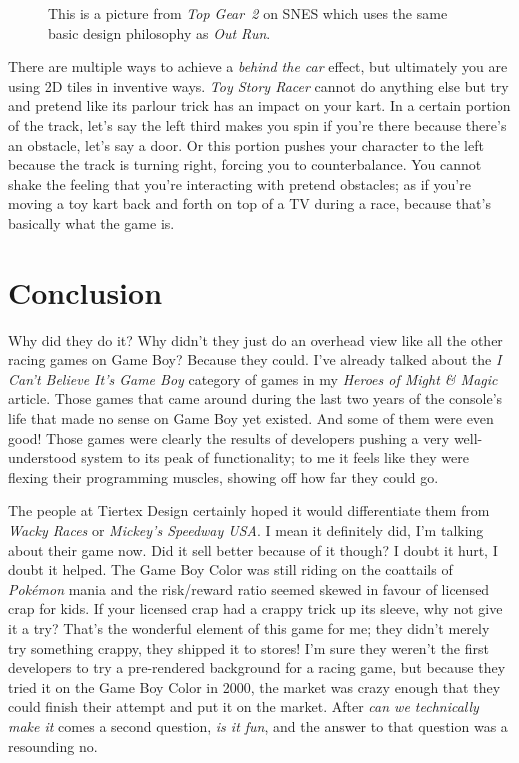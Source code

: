 \documentclass{book}
\begin{document}
\FloatBarrier\vspace{\baselineskip}\begin{figure}[H]\caption*{This is a picture from \emph{Top Gear~2} on SNES which uses the same basic design philosophy as \emph{Out Run}.}\end{figure}
There are multiple ways to achieve a \emph{behind the car} effect, but ultimately you are using 2D tiles in inventive ways. \emph{Toy Story Racer} cannot do anything else but try and pretend like its parlour trick has an impact on your kart. In a certain portion of the track, let’s say the left third makes you spin if you’re there because there’s an obstacle, let’s say a door. Or this portion pushes your character to the left because the track is turning right, forcing you to counterbalance. You cannot shake the feeling that you’re interacting with pretend obstacles; as if you’re moving a toy kart back and forth on top of a TV during a race, because that’s basically what the game is.\par
\FloatBarrier\section*{Conclusion}
Why did they do it? Why didn’t they just do an overhead view like all the other racing games on Game Boy? Because they could. I’ve already talked about the \emph{I Can’t Believe It’s Game Boy} category of games in my \emph{Heroes of Might \& Magic} article. Those games that came around during the last two years of the console’s life that made no sense on Game Boy yet existed. And some of them were even good! Those games were clearly the results of developers pushing a very well-understood system to its peak of functionality; to me it feels like they were flexing their programming muscles, showing off how far they could go.\par
The people at Tiertex Design certainly hoped it would differentiate them from \emph{Wacky Races} or \emph{Mickey’s Speedway USA}. I mean it definitely did, I’m talking about their game now. Did it sell better because of it though? I doubt it hurt, I doubt it helped. The Game Boy Color was still riding on the coattails of \emph{Pokémon} mania and the risk/reward ratio seemed skewed in favour of licensed crap for kids. If your licensed crap had a crappy trick up its sleeve, why not give it a try? That’s the wonderful element of this game for me; they didn’t merely try something crappy, they shipped it to stores! I’m sure they weren’t the first developers to try a pre-rendered background for a racing game, but because they tried it on the Game Boy Color in 2000, the market was crazy enough that they could finish their attempt and put it on the market. After \emph{can we technically make it} comes a second question, \emph{is it fun}, and the answer to that question was a resounding no.\par
\end{document}
